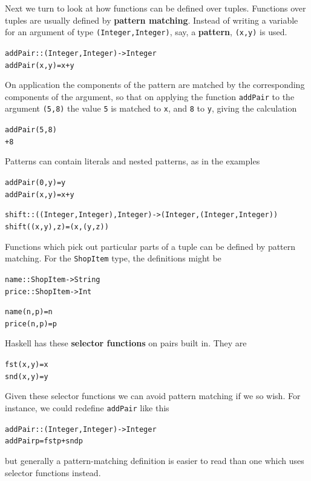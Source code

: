 Next we turn to look at how functions can be defined over tuples.
Functions over tuples are usually defined by \textbf{pattern matching}.
Instead of writing
a variable for an argument of type \texttt{(Integer,Integer)}, say, a \textbf{pattern},
\texttt{(x,y)}
is used. 
\begin{alltt}
addPair :: (Integer,Integer) -> Integer
addPair (x,y) = x+y
\end{alltt}
On application the components of the pattern
are matched by the corresponding components of the argument, so that on
applying the function \texttt{addPair} to the argument \texttt{(5,8)}
the value \texttt{5} is matched to \texttt{x}, and \texttt{8} to
\texttt{y}, giving the calculation
\begin{alltt}
addPair (5,8) 
+8
\end{alltt}
Patterns can contain literals and nested patterns,
as in the examples
\begin{alltt}
addPair (0,y) = y
addPair (x,y) = x+y

shift :: ((Integer,Integer),Integer) -> (Integer,(Integer,Integer))
shift ((x,y),z) = (x,(y,z))
\end{alltt}
Functions which pick out particular parts of a tuple can be defined by
pattern matching. For the \texttt{ShopItem} type, the definitions might be
\begin{alltt}
name  :: ShopItem -> String
price :: ShopItem -> Int

name  (n,p) = n
price (n,p) = p
\end{alltt}
Haskell has these \textbf{selector functions} on pairs built in. They are
\begin{alltt}
fst (x,y) = x
snd (x,y) = y
\end{alltt}
Given these selector functions we can avoid pattern matching if
we so wish. For instance, we could redefine \texttt{addPair} like this
\begin{alltt}
addPair :: (Integer,Integer) -> Integer
addPair p = fst p + snd p
\end{alltt}
but generally a pattern-matching definition is easier to read than
one which uses selector functions instead.


